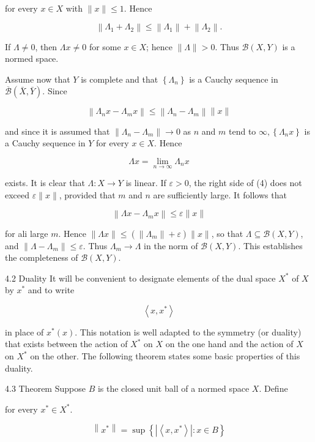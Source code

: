 \documentclass[10pt]{article}
\begin{document}
for every $x \in X$ with $\|x\| \leq 1$. Hence

$$
\left\|\Lambda_{1}+\Lambda_{2}\right\| \leq\left\|\Lambda_{1}\right\|+\left\|\Lambda_{2}\right\| .
$$

If $\Lambda \neq 0$, then $\Lambda x \neq 0$ for some $x \in X$; hence $\|\Lambda\|>0$. Thus $\mathscr{B}(X, Y)$ is a normed space.

Assume now that $Y$ is complete and that $\left\{\Lambda_{n}\right\}$ is a Cauchy sequence in $\overline{\mathscr{B}}(\bar{X}, \bar{Y})$. Since

$$
\left\|\Lambda_{n} x-\Lambda_{m} x\right\| \leq\left\|\Lambda_{n}-\Lambda_{m}\right\|\|x\|
$$

and since it is assumed that $\left\|\Lambda_{n}-\Lambda_{m}\right\| \rightarrow 0$ as $n$ and $m$ tend to $\infty,\left\{\Lambda_{n} x\right\}$ is a Cauchy sequence in $Y$ for every $x \in X$. Hence

$$
\Lambda x=\lim _{n \rightarrow \infty} \Lambda_{n} x
$$

exists. It is clear that $\Lambda: X \rightarrow Y$ is linear. If $\varepsilon>0$, the right side of (4) does not exceed $\varepsilon\|x\|$, provided that $m$ and $n$ are sufficiently large. It follows that

$$
\left\|\Lambda x-\Lambda_{m} x\right\| \leq \varepsilon\|x\|
$$

for ali large $m$. Hence $\|\Lambda x\| \leq\left(\left\|\Lambda_{m}\right\|+\varepsilon\right)\|x\|$, so that $\Lambda \subseteq \mathscr{B}(X, Y)$, and $\left\|\Lambda-\Lambda_{m}\right\| \leq \varepsilon$. Thus $\Lambda_{m} \rightarrow \Lambda$ in the norm of $\mathscr{B}(X, Y)$. This establishes the completeness of $\mathscr{B}(X, Y)$.

4.2 Duality It will be convenient to designate elements of the dual space $X^{*}$ of $X$ by $x^{*}$ and to write

$$
\left\langle x, x^{*}\right\rangle
$$

in place of $x^{*}(x)$. This notation is well adapted to the symmetry (or duality) that exists between the action of $X^{*}$ on $X$ on the one hand and the action of $X$ on $X^{*}$ on the other. The following theorem states some basic properties of this duality.

4.3 Theorem Suppose $B$ is the closed unit ball of a normed space $X$. Define

for every $x^{*} \in X^{*}$.

$$
\left\|x^{*}\right\|=\sup \left\{\left|\left\langle x, x^{*}\right\rangle\right|: x \in B\right\}
$$
\end{document}
